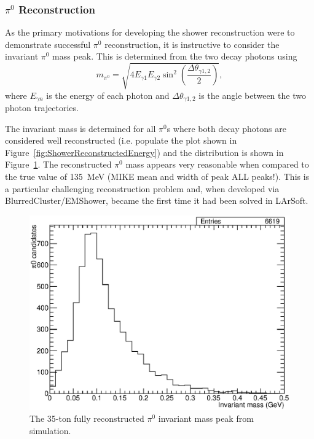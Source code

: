 \subsubsection{$\pi^0$ Reconstruction}\label{sec:pi0Reconstruction}

As the primary motivations for developing the shower reconstruction were to demonstrate successful $\pi^0$ reconstruction, it is instructive to consider the invariant $\pi^0$ mass peak.  This is determined from the two decay photons using
\begin{equation}
  m_{\pi^0} = \sqrt{4 E_{\gamma 1} E_{\gamma 2} \sin^2{\left( \frac{\Delta \theta_{\gamma 1,2}}{2} \right)}},
\end{equation}
where $E_{\gamma n}$ is the energy of each photon and $\Delta \theta_{\gamma 1,2}$ is the angle between the two photon trajectories.

The invariant mass is determined for all $\pi^0$s where both decay photons are considered well reconstructed (i.e. populate the plot shown in Figure~\ref{fig:ShowerReconstructedEnergy}) and the distribution is shown in Figure~\ref{fig:Pi0MassPeak}.  The reconstructed $\pi^0$ mass appears very reasonable when compared to the true value of 135~MeV (MIKE mean and width of peak ALL peaks!).  This is a particular challenging reconstruction problem and, when developed via BlurredCluster/EMShower, became the first time it had been solved in LArSoft.

\begin{figure}
  \centering
  \includegraphics[width=12cm]{Pi0MassPeak.eps}
  \caption[The 35-ton fully reconstructed $\pi^0$ invariant mass peak from simulation.]{The 35-ton fully reconstructed $\pi^0$ invariant mass peak from simulation.}
  \label{fig:Pi0MassPeak}
\end{figure}

